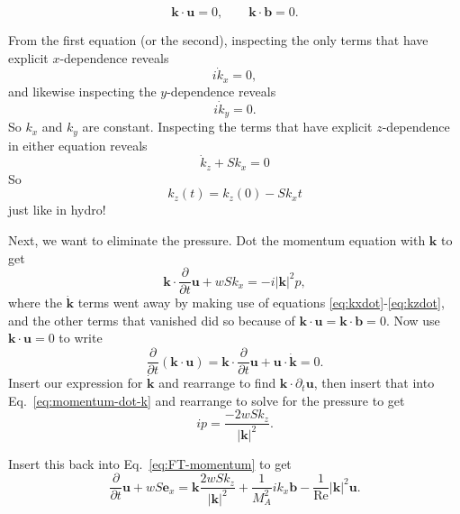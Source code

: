 \documentclass[aps,pop,preprint]{revtex4}
\begin{document}
\begin{equation}
    \mathbf{k} \cdot \mathbf{u} = 0, \qquad \mathbf{k} \cdot \mathbf{b} = 0.
\end{equation}

From the first equation (or the second), inspecting the only terms that have explicit $x$-dependence reveals
\begin{equation} \label{eq:kxdot}
    i \dot{k}_x = 0,
\end{equation}
and likewise inspecting the $y$-dependence reveals 
\begin{equation} \label{eq:kydot}
    i \dot{k}_y = 0.
\end{equation}
So $k_x$ and $k_y$ are constant. Inspecting the terms that have explicit $z$-dependence in either equation reveals
\begin{equation} \label{eq:kzdot}
    \dot{k}_z + S k_x = 0
\end{equation}
So
\begin{equation}
    k_z(t) = k_z(0) - S k_x t
\end{equation}
just like in hydro!

Next, we want to eliminate the pressure. Dot the momentum equation with $\mathbf{k}$ to get
\begin{equation} \label{eq:momentum-dot-k}
\mathbf{k} \cdot \frac{\partial}{\partial t} \mathbf{u} + wS k_x = - i |\mathbf{k}|^2 p,
\end{equation}
where the $\dot{\mathbf{k}}$ terms went away by making use of equations \eqref{eq:kxdot}-\eqref{eq:kzdot}, and the other terms that vanished did so because of $\mathbf{k} \cdot \mathbf{u} = \mathbf{k} \cdot \mathbf{b} = 0$. Now use $\mathbf{k} \cdot \mathbf{u} = 0$ to write 
\begin{equation}
    \frac{\partial}{\partial t}(\mathbf{k} \cdot \mathbf{u}) = \mathbf{k} \cdot \frac{\partial}{\partial t} \mathbf{u} + \mathbf{u} \cdot \dot{\mathbf{k}} = 0.
\end{equation}
Insert our expression for $\dot{\mathbf{k}}$ and rearrange to find $\mathbf{k} \cdot \partial_t \mathbf{u}$, then insert that into Eq.~\eqref{eq:momentum-dot-k} and rearrange to solve for the pressure to get
\begin{equation} \label{eq:pressure}
    i p = \frac{-2wSk_z}{|\mathbf{k}|^2}.
\end{equation}

Insert this back into Eq.~\eqref{eq:FT-momentum} to get
\begin{equation} \label{eq:momentum-no-p}
\frac{\partial}{\partial t} \mathbf{u} + wS \mathbf{e}_x = \mathbf{k} \frac{2wSk_z}{|\mathbf{k}|^2} + \frac{1}{M_A^2} i k_x \mathbf{b} - \frac{1}{\mathrm{Re}} |\mathbf{k}|^2 \mathbf{u}.
\end{equation}
\end{document}
